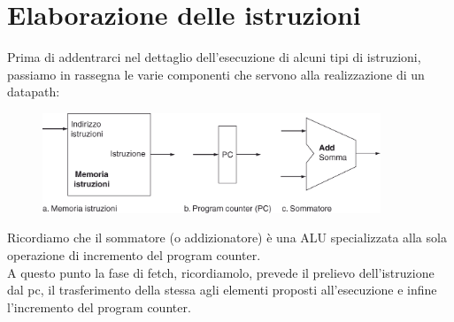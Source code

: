\documentclass[class=book, crop=false, oneside]{standalone}
\begin{document}
\section{Elaborazione delle istruzioni}
Prima di addentrarci nel dettaglio dell'esecuzione di alcuni tipi di istruzioni, passiamo in rassegna le varie componenti che servono alla realizzazione di un datapath:
\begin{figure}[H]
	\centering
	\includegraphics[width=0.9\textwidth,keepaspectratio]{datap_3}
\end{figure}
Ricordiamo che il sommatore (o addizionatore) è una ALU specializzata alla sola operazione di incremento del program counter.\\
A questo punto la fase di fetch, ricordiamolo, prevede il prelievo dell'istruzione dal pc, il trasferimento della stessa agli elementi proposti all'esecuzione e infine l'incremento del program counter.
\end{document}
